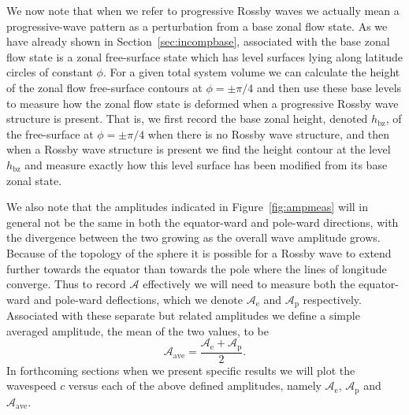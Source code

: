 We now note that when we refer to progressive Rossby waves we actually mean a progressive-wave pattern as a perturbation from a base zonal flow state. As we have already shown in Section~\ref{sec:incompbase}, associated with the base zonal flow state is a zonal free-surface state which has level surfaces lying along latitude circles of constant $\phi$. For a given total system volume we can calculate the height of the zonal flow free-surface contours at $\phi=\pm \pi/4$ and then use these base levels to measure how the zonal flow state is deformed when a progressive Rossby wave structure is present. That is, we first record the base zonal height, denoted $h_{\text{bz}}$, of the free-surface at $\phi=\pm \pi/4$ when there is no Rossby wave structure, and then when a Rossby wave structure is present we find the height contour at the level $h_{\text{bz}}$ and measure exactly how this level surface has been modified from its base zonal state.

We also note that the amplitudes indicated in Figure~\ref{fig:ampmeas} will in general not be the same in both the equator-ward and pole-ward directions, with the divergence between the two growing as the overall wave amplitude grows. Because of the topology of the sphere it is possible for a Rossby wave to extend further towards the equator than towards the pole where the lines of longitude converge. Thus to record $\mathcal{A}$ effectively we will need to measure both the equator-ward and pole-ward deflections, which we denote $\mathcal{A}_{\text{e}}$ and $\mathcal{A}_{\text{p}}$ respectively. Associated with these separate but related amplitudes we define a simple averaged amplitude, the mean of the two values, to be
\begin{equation}
\mathcal{A}_{\text{ave}}=\frac{\mathcal{A}_{\text{e}}+\mathcal{A}_{\text{p}}}{2}.
\end{equation}
In forthcoming sections when we present specific results we will plot the wavespeed $c$ versus each of the above defined amplitudes, namely $\mathcal{A}_{\text{e}}$, $\mathcal{A}_{\text{p}}$ and $\mathcal{A}_{\text{ave}}$.

